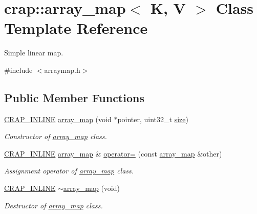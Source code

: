 \hypertarget{classcrap_1_1array__map}{}\section{crap\+:\+:array\+\_\+map$<$ K, V $>$ Class Template Reference}
\label{classcrap_1_1array__map}


Simple linear map.  




{\ttfamily \#include $<$arraymap.\+h$>$}

\subsection*{Public Member Functions}
\begin{DoxyCompactItemize}
\item 
\hyperlink{config__x86_8h_a5a40526b8d842e7ff731509998bb0f1c}{C\+R\+A\+P\+\_\+\+I\+N\+L\+I\+N\+E} \hyperlink{classcrap_1_1array__map_ad8452f8a9a16d043796b5348a7865801}{array\+\_\+map} (void $\ast$pointer, uint32\+\_\+t \hyperlink{classcrap_1_1array__map_a3cabf7c30b1e7d29a8d0e4addbcf6f11}{size})
\begin{DoxyCompactList}\small\item\em Constructor of \hyperlink{classcrap_1_1array__map}{array\+\_\+map} class. \end{DoxyCompactList}\item 
\hyperlink{config__x86_8h_a5a40526b8d842e7ff731509998bb0f1c}{C\+R\+A\+P\+\_\+\+I\+N\+L\+I\+N\+E} \hyperlink{classcrap_1_1array__map}{array\+\_\+map} \& \hyperlink{classcrap_1_1array__map_ad6c30d315809f4ab2a7a3333a060bd74}{operator=} (const \hyperlink{classcrap_1_1array__map}{array\+\_\+map} \&other)
\begin{DoxyCompactList}\small\item\em Assignment operator of \hyperlink{classcrap_1_1array__map}{array\+\_\+map} class. \end{DoxyCompactList}\item 
\hyperlink{config__x86_8h_a5a40526b8d842e7ff731509998bb0f1c}{C\+R\+A\+P\+\_\+\+I\+N\+L\+I\+N\+E} \hyperlink{classcrap_1_1array__map_aa34a83de1d308d255269d160f5a0929e}{$\sim$array\+\_\+map} (void)
\begin{DoxyCompactList}\small\item\em Destructor of \hyperlink{classcrap_1_1array__map}{array\+\_\+map} class. \end{DoxyCompactList}\item 

\end{DoxyCompactItemize}

